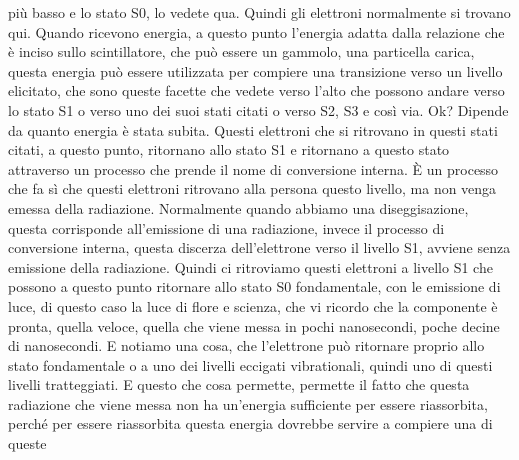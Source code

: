 {più basso e lo stato S0, lo vedete qua. Quindi gli elettroni normalmente si trovano qui. Quando ricevono energia, a questo punto l'energia adatta dalla relazione che è inciso sullo scintillatore, che può essere un gammolo, una particella carica, questa energia può essere utilizzata per compiere una transizione verso un livello elicitato, che sono queste facette che vedete verso l'alto che possono andare verso lo stato S1 o verso uno dei suoi stati citati o verso S2, S3 e così via. Ok? Dipende da quanto energia è stata subita. Questi elettroni che si ritrovano in questi stati citati, a questo punto, ritornano allo stato S1 e ritornano a questo stato attraverso un processo che prende il nome di conversione interna. È un processo che fa sì che questi elettroni ritrovano alla persona questo livello, ma non venga emessa della radiazione. Normalmente quando abbiamo una diseggisazione, questa corrisponde all'emissione di una radiazione, invece il processo di conversione interna, questa discerza dell'elettrone verso il livello S1, avviene senza emissione della radiazione. Quindi ci ritroviamo questi elettroni a livello S1 che possono a questo punto ritornare allo stato S0 fondamentale, con le emissione di luce, di questo caso la luce di flore e scienza, che vi ricordo che la componente è pronta, quella veloce, quella che viene messa in pochi nanosecondi, poche decine di nanosecondi. E notiamo una cosa, che l'elettrone può ritornare proprio allo stato fondamentale o a uno dei livelli eccigati vibrationali, quindi uno di questi livelli tratteggiati. E questo che cosa permette, permette il fatto che questa radiazione che viene messa non ha un'energia sufficiente per essere riassorbita, perché per essere riassorbita questa energia dovrebbe servire a compiere una di queste 

}
